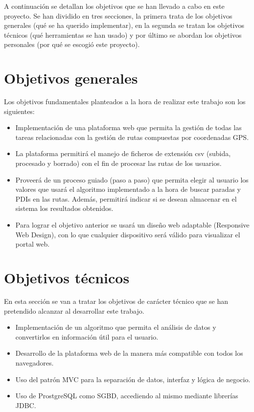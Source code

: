 
A continuación se detallan los objetivos que se han llevado a cabo en este proyecto. Se han dividido en tres secciones, la primera trata de los objetivos generales (qué se ha querido implementar), en la segunda se tratan los objetivos técnicos (qué herramientas se han usado) y por último se abordan los objetivos personales (por qué se escogió este proyecto).

\section{Objetivos generales}

Los objetivos fundamentales planteados a la hora de realizar este trabajo son los siguientes:

\begin{itemize}
	\item Implementación de una plataforma web que permita la gestión de todas las tareas relacionadas con la gestión de rutas compuestas por coordenadas GPS.
	\item La plataforma permitirá el manejo de ficheros de extensión csv (subida, procesado y borrado) con el fin de procesar las rutas de los usuarios.
	\item Proveerá de un proceso guiado (paso a paso) que permita elegir al usuario los valores que usará el algoritmo implementado a la hora de buscar paradas y PDIs en las rutas. Además, permitirá indicar si se desean almacenar en el sistema los resultados obtenidos.
	\item Para lograr el objetivo anterior se usará un diseño web adaptable (Responsive Web Design), con lo que cualquier dispositivo será válido para visualizar el portal web.
\end{itemize}

\section{Objetivos técnicos}
En esta sección se van a tratar los objetivos de carácter técnico que se han pretendido alcanzar al desarrollar este trabajo.

\begin{itemize}
	\item Implementación de un algoritmo que permita el análisis de datos y convertirlos en información útil para el usuario.
	\item Desarrollo de la plataforma web de la manera más compatible con todos los navegadores.
	\item Uso del patrón MVC para la separación de datos, interfaz y lógica de negocio.
	\item Uso de ProstgreSQL como SGBD, accediendo al mismo mediante librerías JDBC.
\end{itemize}

